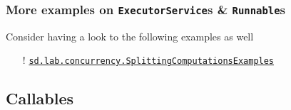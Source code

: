 \documentclass{beamer}\mode<presentation>{\usetheme{AMSCesenaPurpleAndGold}}
\begin{document}
\begin{frame}[c]
\frametitle{More examples on \texttt{ExecutorService}s \& \texttt{Runnable}s}

Consider having a look to the following examples as well
%
\begin{itemize}
	\item[!] \href{https://gitlab.com/pika-lab/courses/ds/aa1920/lab-03/blob/master/src/test/java/sd/lab/concurrency/SplittingComputationsExamples.java}{\texttt{sd.lab.concurrency.\alert{SplittingComputationsExamples}}}
\end{itemize}

\end{frame}

\subsection{Callables}
\end{document}
